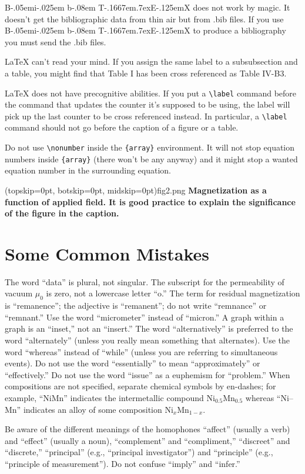 \documentclass{ieeeaccess}
\def\BibTeX{{\rm B\kern-.05em{\sc i\kern-.025em b}\kern-.08em
    T\kern-.1667em\lower.7ex\hbox{E}\kern-.125emX}}
\begin{document}
{\BibTeX} does not work by magic. It doesn't get the bibliographic
data from thin air but from .bib files. If you use {\BibTeX} to produce a
bibliography you must send the .bib files.

{\LaTeX} can't read your mind. If you assign the same label to a
subsubsection and a table, you might find that Table I has been cross
referenced as Table IV-B3.

{\LaTeX} does not have precognitive abilities. If you put a
\verb|\label| command before the command that updates the counter it's
supposed to be using, the label will pick up the last counter to be
cross referenced instead. In particular, a \verb|\label| command
should not go before the caption of a figure or a table.

Do not use \verb|\nonumber| inside the \verb|{array}| environment. It
will not stop equation numbers inside \verb|{array}| (there won't be
any anyway) and it might stop a wanted equation number in the
surrounding equation.


\Figure[t!](topskip=0pt, botskip=0pt, midskip=0pt){fig2.png}
{ \textbf{Magnetization as a function of applied field.
It is good practice to explain the significance of the figure in the caption.}\label{fig2}}

\section{Some Common Mistakes}
The word ``data'' is plural, not singular. The subscript for the
permeability of vacuum $\mu _{0}$ is zero, not a lowercase letter
``o.'' The term for residual magnetization is ``remanence''; the adjective
is ``remanent''; do not write ``remnance'' or ``remnant.'' Use the word
``micrometer'' instead of ``micron.'' A graph within a graph is an
``inset,'' not an ``insert.'' The word ``alternatively'' is preferred to the
word ``alternately'' (unless you really mean something that alternates). Use
the word ``whereas'' instead of ``while'' (unless you are referring to
simultaneous events). Do not use the word ``essentially'' to mean
``approximately'' or ``effectively.'' Do not use the word ``issue'' as a
euphemism for ``problem.'' When compositions are not specified, separate
chemical symbols by en-dashes; for example, ``NiMn'' indicates the
intermetallic compound Ni$_{0.5}$Mn$_{0.5}$ whereas
``Ni--Mn'' indicates an alloy of some composition
Ni$_{x}$Mn$_{1-x}$.

Be aware of the different meanings of the homophones ``affect'' (usually a
verb) and ``effect'' (usually a noun), ``complement'' and ``compliment,''
``discreet'' and ``discrete,'' ``principal'' (e.g., ``principal
investigator'') and ``principle'' (e.g., ``principle of measurement''). Do
not confuse ``imply'' and ``infer.''
\end{document}

